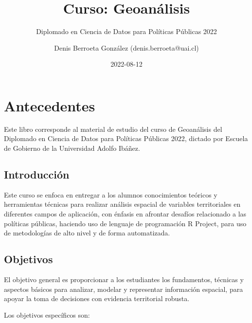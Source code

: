 \documentclass[
  letterpaper,
  DIV=11,
  numbers=noendperiod]{scrreprt}
\title{Curso: Geoanálisis}
\subtitle{Diplomado en Ciencia de Datos para Políticas Públicas 2022}
\author{Denis Berroeta González (denis.berroeta@uai.cl)}
\date{2022-08-12}
\renewcommand*\contentsname{Table of contents}
\newcommand\contentsname{Table of contents}
\begin{document}
\maketitle
\ifdefined\Shaded\renewenvironment{Shaded}{\begin{tcolorbox}[borderline west={3pt}{0pt}{shadecolor}, enhanced, frame hidden, interior hidden, breakable, sharp corners, boxrule=0pt]}{\end{tcolorbox}}\fi

\renewcommand*\contentsname{Table of contents}
{
\hypersetup{linkcolor=}
\setcounter{tocdepth}{2}
\tableofcontents
}

\hypertarget{antecedentes}{%
\chapter*{Antecedentes}\label{antecedentes}}

Este libro corresponde al material de estudio del curso de Geoanálisis
del Diplomado en Ciencia de Datos para Políticas Públicas 2022, dictado
por Escuela de Gobierno de la Universidad Adolfo Ibáñez.

\hypertarget{introducciuxf3n}{%
\section*{Introducción}\label{introducciuxf3n}}

Este curso se enfoca en entregar a los alumnos conocimientos teóricos y
herramientas técnicas para realizar análisis espacial de variables
territoriales en diferentes campos de aplicación, con énfasis en
afrontar desafíos relacionado a las políticas públicas, haciendo uso de
lenguaje de programación R Project, para uso de metodologías de alto
nivel y de forma automatizada.

\hypertarget{objetivos}{%
\section*{Objetivos}\label{objetivos}}

El objetivo general es proporcionar a los estudiantes los fundamentos,
técnicas y aspectos básicos para analizar, modelar y representar
información espacial, para apoyar la toma de decisiones con evidencia
territorial robusta.

Los objetivos específicos son:
\end{document}
